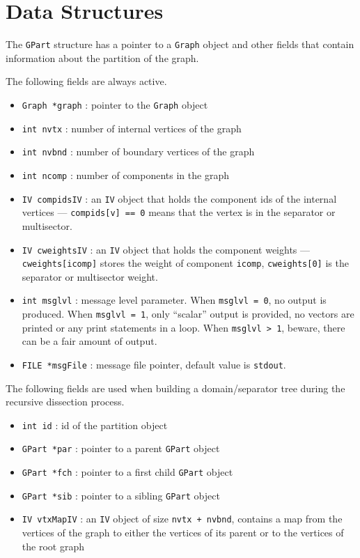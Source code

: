 \par
\section{Data Structures}
\label{section:GPart:dataStructure}
\par
The {\tt GPart} structure has a pointer to a {\tt Graph} object
and other fields that contain information about the partition
of the graph.
\par
The following fields are always active.
\begin{itemize}
\item 
{\tt Graph *graph} : pointer to the {\tt Graph} object
\item 
{\tt int nvtx} : number of internal vertices of the graph
\item 
{\tt int nvbnd} : number of boundary vertices of the graph
\item 
{\tt int ncomp} : number of components in the graph
\item 
{\tt IV compidsIV} : an {\tt IV} object that holds the component
ids of the internal vertices --- {\tt compids[v] == 0}
means that the vertex is in the separator or multisector.
\item 
{\tt IV cweightsIV} : an {\tt IV} object that holds the component
weights --- {\tt cweights[icomp]} stores the weight 
of component {\tt icomp}, {\tt cweights[0]} is the separator 
or multisector weight.
\item
{\tt int msglvl} : message level parameter. 
When {\tt msglvl = 0}, no output is produced.
When {\tt msglvl = 1}, only ``scalar'' output is provided,
no vectors are printed or any print statements in a loop.
When {\tt msglvl > 1}, beware, there can be a fair amount of output.
\item
{\tt FILE *msgFile} 
: message file pointer, default value is {\tt stdout}.
\end{itemize}
The following fields are used when building a domain/separator tree
during the recursive dissection process.
\begin{itemize}
\item {\tt int id}  : id of the partition object
\item {\tt GPart *par} : pointer to a parent {\tt GPart} object
\item {\tt GPart *fch} : pointer to a first child {\tt GPart} object
\item {\tt GPart *sib} : pointer to a sibling {\tt GPart} object
\item {\tt IV vtxMapIV} : an {\tt IV} object of size
      {\tt nvtx + nvbnd}, contains a map from the vertices of the graph 
      to either the vertices of its parent or to the vertices 
      of the root graph 
\end{itemize}

